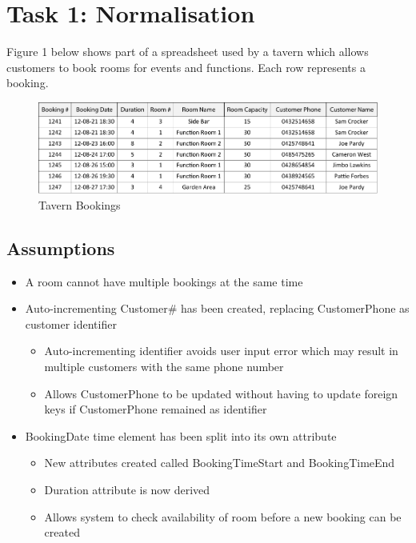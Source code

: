\section{Task 1: Normalisation}

Figure 1 below shows part of a spreadsheet used by a tavern which allows customers to book rooms for events and functions. Each row represents a booking.

\begin{figure}[H]
\centering
\caption{Tavern Bookings}
\includegraphics[scale=0.8]{./img/task1.pdf}
\end{figure}

\subsection*{Assumptions}

\begin{itemize}
\item A room cannot have multiple bookings at the same time
\item Auto-incrementing Customer\# has been created, replacing CustomerPhone as customer identifier
	\begin{itemize}
	\item Auto-incrementing identifier avoids user input error which may result in multiple customers with the same phone number
	\item Allows CustomerPhone to be updated without having to update foreign keys if CustomerPhone remained as identifier
	\end{itemize}
\item BookingDate time element has been split into its own attribute
	\begin{itemize}
	\item New attributes created called BookingTimeStart and BookingTimeEnd
	\item Duration attribute is now derived
	\item Allows system to check availability of room before a new booking can be created
	\end{itemize}
\end{itemize}

